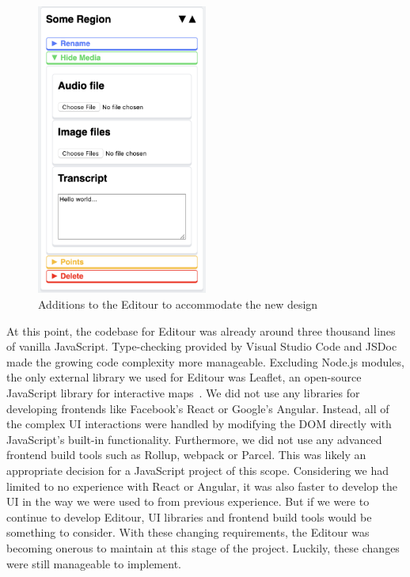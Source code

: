 \documentclass[a4paper, 10pt, american, titlepage]{article}
\begin{document}
\begin{figure}[h]
	\centering
	\includegraphics[width=0.5\textwidth]{editour-additions.png}
	\caption{Additions to the Editour to accommodate the new design}
	\label{fig:editourAdditions}
\end{figure}

At this point, the codebase for Editour was already around three thousand lines
of vanilla JavaScript. Type-checking provided by Visual Studio Code and JSDoc
made the growing code complexity more manageable. Excluding Node.js modules,
the only external library we used for Editour was Leaflet, an open-source
JavaScript library for interactive maps~\autocite{leafletjs}. We did not use
any libraries for developing frontends like Facebook's React or Google's
Angular. Instead, all of the complex UI interactions were handled by modifying
the DOM directly with JavaScript's built-in functionality. Furthermore, we did
not use any advanced frontend build tools such as Rollup, webpack or Parcel.
This was likely an appropriate decision for a JavaScript project of this scope.
Considering we had limited to no experience with React or Angular, it was also
faster to develop the UI in the way we were used to from previous experience.
But if we were to continue to develop Editour, UI libraries and frontend build
tools would be something to consider. With these changing requirements, the
Editour was becoming onerous to maintain at this stage of the project. Luckily,
these changes were still manageable to implement.
\end{document}
